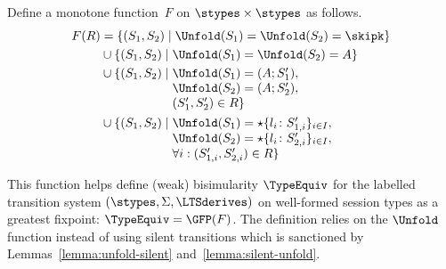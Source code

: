 \begin{definition}
Define a monotone function~$F$ on $\stypes\times\stypes$ as 
follows. 
%
\begin{align*}
  F (R) &= \{ (S_1, S_2) \mid \Unfold (S_1) = \Unfold (S_2) = \skipk \}
  \\
        &\cup \{ (S_1, S_2) \mid \Unfold (S_1) = \Unfold (S_2) = A \}
  \\
        &\cup \{ (S_1, S_2) \mid
          \begin{array}[t]{@{}l}
            \Unfold (S_1) = (A; S_1'),\\
            \Unfold (S_2) = (A; S_2'), \\
            (S_1', S_2')  \in R \}
          \end{array}
  \\
        &\cup \{ (S_1, S_2) \mid
          \begin{array}[t]{@{}l}
            \Unfold (S_1) = \star\{l_i\colon S_{1,i}'\}_{i\in I}, \\
            \Unfold (S_2) = \star\{l_i\colon S_{2,i}'\}_{i\in I}, \\
            \forall i: (S'_{1,i}, S'_{2,i}) \in R \}
          \end{array}
\end{align*}

This function helps define (weak) bisimularity $\TypeEquiv$ for the labelled transition system
$(\stypes, \Sigma, \LTSderives)$ on well-formed session types as a greatest fixpoint: ${\TypeEquiv}
= \GFP (F)$. The 
definition relies on the $\Unfold$ function instead of using silent transitions which is sanctioned
by Lemmas~\ref{lemma:unfold-silent} and~\ref{lemma:silent-unfold}.
\end{definition}

